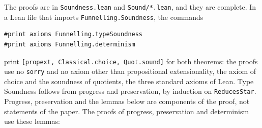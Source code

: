 The proofs are in \texttt{Soundness.lean} and \texttt{Sound/*.lean}, and they are complete.
In a Lean file that imports \texttt{Funnelling.Soundness}, the commands
\begin{lstlisting}[language=lean,basicstyle=\scriptsize\ttfamily]
#print axioms Funnelling.typeSoundness
#print axioms Funnelling.determinism
\end{lstlisting}
print \texttt{[propext, Classical.choice, Quot.sound]} for both theorems: the proofs use no \texttt{sorry} and no axiom other than propositional extensionality, the axiom of choice and the soundness of quotients, the three standard axioms of Lean.
Type Soundness follows from progress and preservation, by induction on \texttt{ReducesStar}.
Progress, preservation and the lemmas below are components of the proof, not statements of the paper.
The proofs of progress, preservation and determinism use these lemmas:

